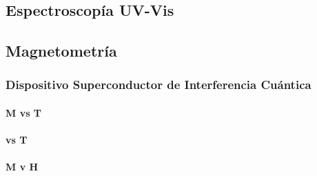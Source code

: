 \documentclass[../main.tex]{subfiles}
\begin{document}
\subsection{Espectroscopía UV-Vis}

\subsection{Magnetometría}

\subsubsection{Dispositivo Superconductor de Interferencia Cuántica}

\paragraph{M vs T}

\paragraph{\textchi{} vs T}

\paragraph{M v H}
\end{document}
